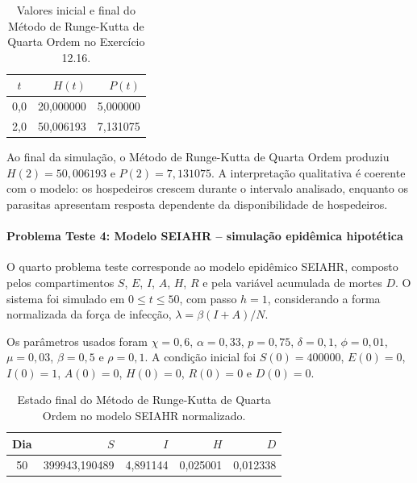 \begin{table}[H]
    \centering
    \caption{Valores inicial e final do Método de Runge-Kutta de Quarta Ordem no Exercício 12.16.}
    \begin{tabular}{c|r|r}
        \textbf{\(t\)} & \textbf{\(H(t)\)} & \textbf{\(P(t)\)} \\
        \hline
        0{,}0 & 20{,}000000 & 5{,}000000 \\
        2{,}0 & 50{,}006193 & 7{,}131075 \\
    \end{tabular}
\end{table}

Ao final da simulação, o Método de Runge-Kutta de Quarta Ordem produziu \(H(2)=50{,}006193\) e \(P(2)=7{,}131075\). A interpretação qualitativa é coerente com o modelo: os hospedeiros crescem durante o intervalo analisado, enquanto os parasitas apresentam resposta dependente da disponibilidade de hospedeiros.

\paragraph{Problema Teste 4: Modelo SEIAHR -- simulação epidêmica hipotética}

O quarto problema teste corresponde ao modelo epidêmico SEIAHR, composto pelos compartimentos \(S\), \(E\), \(I\), \(A\), \(H\), \(R\) e pela variável acumulada de mortes \(D\). O sistema foi simulado em \(0\leq t\leq 50\), com passo \(h=1\), considerando a forma normalizada da força de infecção, \(\lambda=\beta(I+A)/N\).

Os parâmetros usados foram \(\chi=0{,}6\), \(\alpha=0{,}33\), \(p=0{,}75\), \(\delta=0{,}1\), \(\phi=0{,}01\), \(\mu=0{,}03\), \(\beta=0{,}5\) e \(\rho=0{,}1\). A condição inicial foi \(S(0)=400000\), \(E(0)=0\), \(I(0)=1\), \(A(0)=0\), \(H(0)=0\), \(R(0)=0\) e \(D(0)=0\).

\begin{table}[H]
    \centering
    \caption{Estado final do Método de Runge-Kutta de Quarta Ordem no modelo SEIAHR normalizado.}
    \begin{tabular}{c|r|r|r|r}
        \textbf{Dia} & \textbf{\(S\)} & \textbf{\(I\)} & \textbf{\(H\)} & \textbf{\(D\)} \\
        \hline
        50 & 399943{,}190489 & 4{,}891144 & 0{,}025001 & 0{,}012338 \\
    \end{tabular}
\end{table}

